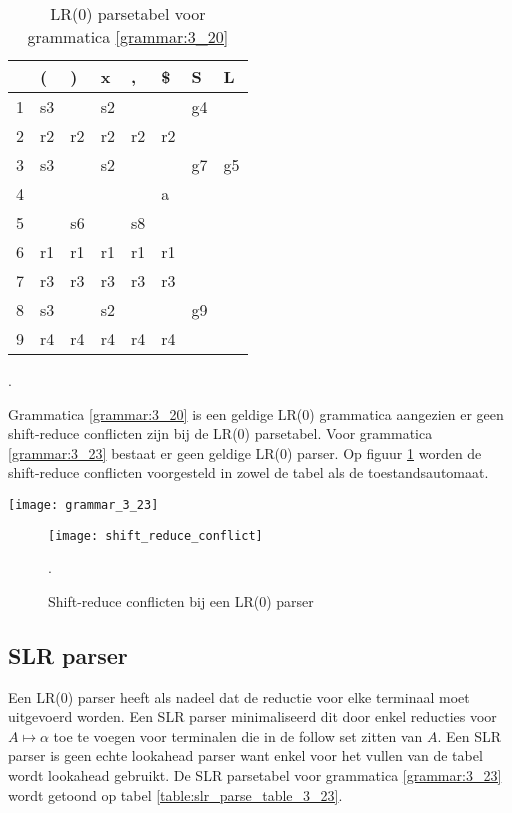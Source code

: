 \begin{table}[ht]
	\centering
	\begin{tabular}{l|lllll|ll|}
		  & (  & )  & x  & ,  & \$ & S  & L  \\
		  \hline
		1 & s3 &    & s2 &    &    & g4 &    \\
		2 & r2 & r2 & r2 & r2 & r2 &    &    \\
		3 & s3 &    & s2 &    &    & g7 & g5 \\
		4 &    &    &    &    & a  &    &    \\
		5 &    & s6 &    & s8 &    &    &    \\
		6 & r1 & r1 & r1 & r1 & r1 &    &    \\
		7 & r3 & r3 & r3 & r3 & r3 &    &    \\
		8 & s3 &    & s2 &    &    & g9 &    \\
		9 & r4 & r4 & r4 & r4 & r4 &    &   \\
		\hline
	\end{tabular}
	\caption{LR(0) parsetabel voor grammatica \ref{grammar:3_20}}.
	\label{table:parsingtable_3_20}
\end{table}

Grammatica \ref{grammar:3_20} is een geldige LR(0) grammatica aangezien er geen shift-reduce conflicten zijn bij de LR(0) parsetabel. Voor grammatica \ref{grammar:3_23} bestaat er geen geldige LR(0) parser. Op figuur \ref{fig:shift_reduce_conflict} worden de shift-reduce conflicten voorgesteld in zowel de tabel als de toestandsautomaat.
\begin{grammarfigure}
	\centering
	\texttt{[image: grammar\_3\_23]}
	\caption{}
	\label{grammar:3_23}
\end{grammarfigure}
\begin{figure}[ht]
	\centering
	\texttt{[image: shift\_reduce\_conflict]}
	\caption{Shift-reduce conflicten bij een LR(0) parser}.
	\label{fig:shift_reduce_conflict}
\end{figure}



\subsection{SLR parser}
Een LR(0) parser heeft als nadeel dat de reductie voor elke terminaal moet uitgevoerd worden. Een SLR parser minimaliseerd dit door enkel reducties voor $A \mapsto \alpha$ toe te voegen voor terminalen die in de follow set zitten van $A$. Een SLR parser is geen echte lookahead parser want enkel voor het vullen van de tabel wordt lookahead gebruikt. De SLR parsetabel voor grammatica \ref{grammar:3_23} wordt getoond op tabel \ref{table:slr_parse_table_3_23}.

